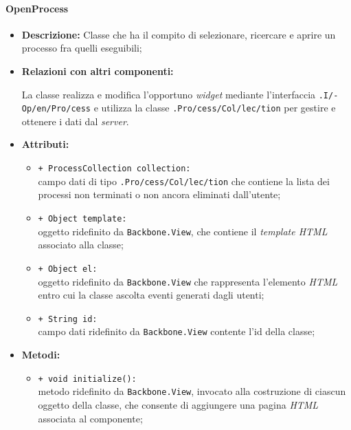 \paragraph{OpenProcess}
\label{openProcessU}
\begin{flushleft}
\begin{itemize}
\item \textbf{Descrizione:} Classe che ha il compito di selezionare, ricercare e aprire un processo fra quelli eseguibili;
\item \textbf{Relazioni con altri componenti:}
\begin{sloppypar}
La classe realizza e modifica l'opportuno \textit{widget} mediante l'interfaccia \texttt{\viewUser{}.I\fshyp{}Op\fshyp{}en\fshyp{}Pro\fshyp{}cess} e utilizza la classe \texttt{\collection{}.Pro\fshyp{}cess\fshyp{}Col\fshyp{}lec\fshyp{}tion} per gestire e ottenere i dati dal \textit{server}.
\end{sloppypar}
\item \textbf{Attributi:}
\begin{sloppypar}
\begin{itemize}
\item \texttt{+ ProcessCollection collection:}\\ campo dati di tipo \texttt{\collection{}.Pro\fshyp{}cess\fshyp{}Col\fshyp{}lec\fshyp{}tion} che contiene la lista dei processi non terminati o non ancora eliminati dall'utente;
\item \texttt{+ Object template:}\\ oggetto ridefinito da \texttt{Backbone.View}, che contiene il \textit{template HTML} associato alla classe;
\item \texttt{+ Object el:}\\ oggetto ridefinito da \texttt{Backbone.View} che rappresenta l'elemento \textit{HTML} entro cui la classe ascolta eventi generati dagli utenti;
\item \texttt{+ String id:}\\ campo dati ridefinito da \texttt{Backbone.View} contente l'id della classe;
\end{itemize}
\end{sloppypar}
\item \textbf{Metodi:}
\begin{sloppypar}
\begin{itemize}
\item \texttt{+ void initialize():}\\ metodo ridefinito da \texttt{Backbone.View}, invocato alla costruzione di ciascun oggetto della classe, che consente di aggiungere una pagina \textit{HTML} associata al componente;

\end{itemize}
\end{sloppypar}
\end{itemize}
\end{flushleft}
